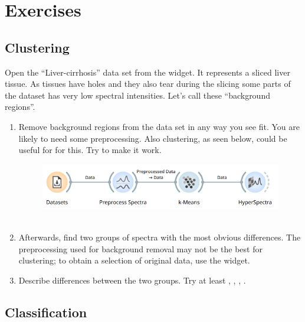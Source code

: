 \chapter{Exercises}

\section{Clustering}

Open the ``Liver-cirrhosis'' data set from the  widget. It represents a sliced liver tissue. As tissues have holes and they also tear during the slicing some parts of the dataset has very low spectral intensities. Let's call these ``background regions''.

\begin{enumerate}
\item Remove background regions from the data set in any way you see fit. You are likely to need some preprocessing. Also clustering, as seen below, could be useful for for this. Try to make it work.

\vspace{-0.2cm}
\begin{figure}[h]
  \centering
  \includegraphics[width=\linewidth]{cirrhosis-background.png}%
  \caption{$\;$}
\end{figure}
\vspace{-0.3cm}

\item Afterwards, find two groups of spectra with the most obvious differences. The preprocessing used for background removal may not be the best for clustering; to obtain a selection of original data, use the  widget.

\item Describe differences between the two groups. Try at least , , , .

\end{enumerate}


\section{Classification}

